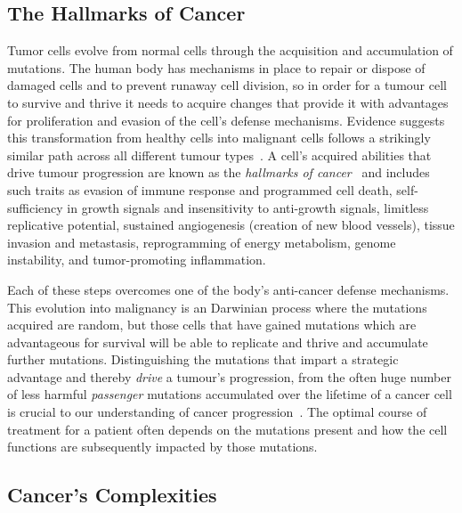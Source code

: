 \begin{justify}
\subsection{The Hallmarks of Cancer}

Tumor cells evolve from normal cells through the acquisition and accumulation of mutations.
The human body has mechanisms in place to repair or dispose of damaged cells and to prevent runaway cell division, so in order for a tumour cell to survive and thrive it needs to acquire changes that provide it with advantages for proliferation and evasion of the cell's defense mechanisms.
Evidence suggests this transformation from healthy cells into malignant cells follows a strikingly similar path across all different tumour types~\cite{hanahan2000hallmarks}.
A cell's acquired abilities that drive tumour progression are known as the \emph{hallmarks of cancer}~\cite{hanahan2000hallmarks,hanahan2011hallmarks,lazebnik2010hallmarks,horne2015evolutionary,fouad2017revisiting} and includes such traits as evasion of immune response and programmed cell death, self-sufficiency in growth signals and insensitivity to anti-growth signals, limitless replicative potential, sustained angiogenesis (creation of new blood vessels), tissue invasion and metastasis, reprogramming of energy metabolism, genome instability, and tumor-promoting inflammation.

Each of these steps overcomes one of the body's anti-cancer defense mechanisms. This evolution into malignancy is an Darwinian process where the mutations acquired are random, but those cells that have gained mutations which are advantageous for survival will be able to replicate and thrive and accumulate further mutations. Distinguishing the mutations that impart a strategic advantage and thereby \emph{drive} a tumour's progression, from the often huge number of less harmful \emph{passenger} mutations accumulated over the lifetime of a cancer cell is crucial to our understanding of cancer progression~\cite{stratton2009cancer}. The optimal course of treatment for a patient often depends on the mutations present and how the cell functions are subsequently impacted by those mutations. %



\subsection{Cancer's Complexities}


\end{justify}
